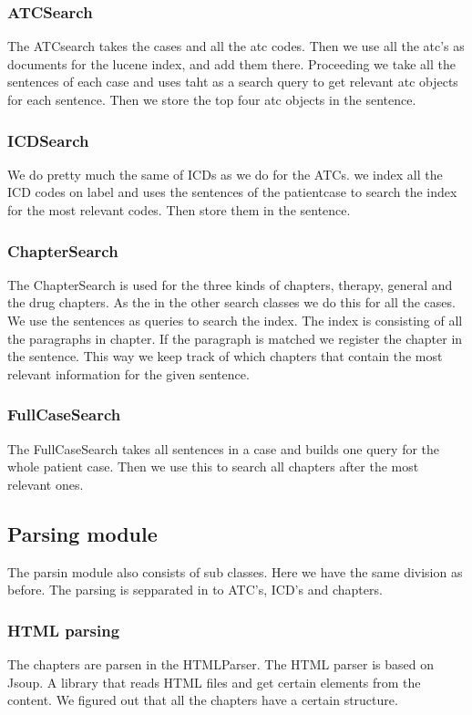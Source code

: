 \documentclass[12pt, a4paper]{article}
\begin{document}
\subsubsection{ATCSearch}
The ATCsearch takes the cases and all the atc codes. Then we use all the atc's
as documents for the lucene index, and add them there. Proceeding we take all
the sentences of each case and uses taht as a search query to get relevant atc
objects for each sentence. Then we store the top four atc objects in the sentence. 

\subsubsection{ICDSearch}
We do pretty much the same of ICDs as we do for the ATCs. we index all the ICD
codes on label and uses the sentences of the patientcase to search the index
for the most relevant codes. Then store them in the sentence. 

\subsubsection{ChapterSearch}
The ChapterSearch is used for the three kinds of chapters, therapy, general and
the drug chapters. As the in the other search classes we do this for all the
cases. We use the sentences as queries to search the index. The index is
consisting of all the paragraphs in chapter. If the paragraph is matched we
register the chapter in the sentence. This way we keep track of which chapters
that contain the most relevant information for the given sentence. 

\subsubsection{FullCaseSearch}
The FullCaseSearch takes all sentences in a case and builds one query for the
whole patient case. Then we use this to search all chapters after the most
relevant ones. 

\subsection{Parsing module}
The parsin module also consists of sub classes. Here we have the same division
as before. The parsing is sepparated in to ATC's, ICD's and chapters. 

\subsubsection{HTML parsing}
The chapters are parsen in the HTMLParser. The HTML parser is based on Jsoup. A
library that reads HTML files and get certain elements from the content. We
figured out that all the chapters have a certain structure. 
\end{document}
